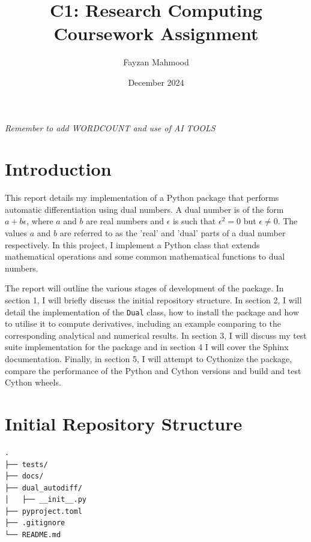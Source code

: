 \documentclass{article}
\title{C1: Research Computing Coursework Assignment}
\author{Fayzan Mahmood}
\date{December 2024}
\begin{document}
\maketitle
\textit{Remember to add WORDCOUNT and use of AI TOOLS}

\section*{Introduction}
This report details my implementation of a Python package that performs automatic differentiation using dual numbers. A dual number is of the form $a+b\epsilon$, where $a$ and $b$ are real numbers and $\epsilon$ is such that $\epsilon^2=0$ but $\epsilon \neq 0$. The values $a$ and $b$ are referred to as the 'real' and 'dual' parts of a dual number respectively. In this project, I implement a Python class that extends mathematical operations and some common mathematical functions to dual numbers. 

The report will outline the various stages of development of the package. In section 1, I will briefly discuss the initial repository structure. In section 2, I will detail the implementation of the \texttt{Dual} class, how to install the package and how to utilise it to compute derivatives, including an example comparing to the corresponding analytical and numerical results. In section 3, I will discuss my test suite implementation for the package and in section 4 I will cover the Sphinx documentation. Finally, in section 5, I will attempt to Cythonize the package, compare the performance of the Python and Cython versions and build and test Cython wheels.

\section{Initial Repository Structure}

\begin{verbatim}
.
├── tests/
├── docs/
├── dual_autodiff/
│   ├── __init__.py
├── pyproject.toml
├── .gitignore 
└── README.md
        
\end{verbatim}  
\end{document}
